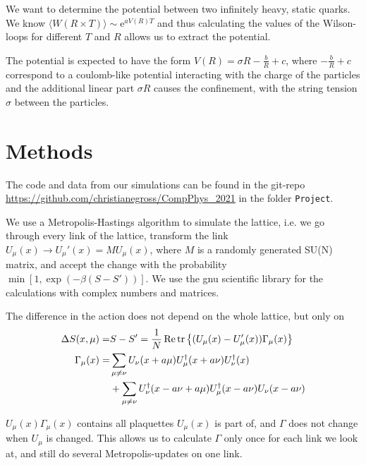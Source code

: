 \documentclass[%
 reprint,
 amsmath,amssymb,
 aps,
]{revtex4-1}
\renewcommand{\Re}{\operatorname{Re}}
\begin{document}
We want to determine the potential between two infinitely heavy, static quarks. We know
$\langle W(R\times T)\rangle\sim \mathrm{e}^{aV(R)T}$%
and thus calculating the values of the Wilson-loops for different $T$ and $R$ allows us to extract the potential. 

The potential is expected to have the form $V(R)=\sigma R-\frac{b}{R}+c$, where $-\frac{b}{R}+c$ correspond to a coulomb-like potential interacting with the charge of the particles and the additional linear part $\sigma R$ causes the confinement, with the string tension $\sigma$ between the particles.


\section{Methods}


The code and data from our simulations can be found in the git-repo \url{https://github.com/christianegross/CompPhys_2021} in the folder \texttt{Project}.

We use a Metropolis-Hastings algorithm to simulate the lattice, i.e. we go through every link of the lattice, transform the link $U_\mu(x)\to U_\mu'(x)=MU_\mu(x)$, where $M$ is a randomly generated SU(N) matrix, and accept the change with the probability $\min[1, \exp(-\beta(S-S'))]$. We use the gnu scientific library for the calculations with complex numbers and matrices.

The difference in the action does not depend on the whole lattice, but only on \begin{align*}
\Delta S(x, \mu)=&S-S'=\frac{1}{N}\Re\tr\left\lbrace (U_\mu(x)-U'_\mu(x))\Gamma_\mu(x)\right\rbrace\\
%
\Gamma_\mu(x)=&\sum_{\mu\neq\nu}U_\nu(x+a\mu)U_\mu^\dagger(x+a\nu)U_\nu^\dagger(x)\\
%
&+\sum_{\mu\neq\nu}U^\dagger_\nu(x-a\nu+a\mu) U^\dagger_\mu(x-a\nu)U_\nu(x-a\nu)
\end{align*}

$U_\mu(x)\Gamma_\mu(x)$ contains all plaquettes $U_\mu(x)$ is part of, and $\Gamma$ does not change when $U_\mu$ is changed. This allows us to calculate $\Gamma$ only once for each link we look at, and still do several Metropolis-updates on one link.
\end{document}

